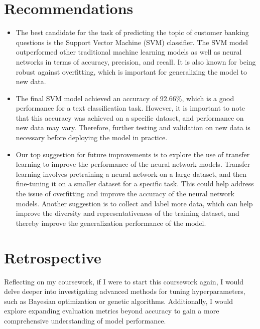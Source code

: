 \documentclass[12pt, a4paper]{article}
\begin{document}
\section{Recommendations}
\begin{itemize}
    \item The best candidate for the task of predicting the topic of customer banking questions is the Support Vector Machine (SVM) classifier. The SVM model outperformed other traditional machine learning models as well as neural networks in terms of accuracy, precision, and recall. It is also known for being robust against overfitting, which is important for generalizing the model to new data. 
    \item The final SVM model achieved an accuracy of 92.66\%, which is a good performance for a text classification task. However, it is important to note that this accuracy was achieved on a specific dataset, and performance on new data may vary. Therefore, further testing and validation on new data is necessary before deploying the model in practice.
    \item Our top suggestion for future improvements is to explore the use of transfer learning to improve the performance of the neural network models. Transfer learning involves pretraining a neural network on a large dataset, and then fine-tuning it on a smaller dataset for a specific task. This could help address the issue of overfitting and improve the accuracy of the neural network models. Another suggestion is to collect and label more data, which can help improve the diversity and representativeness of the training dataset, and thereby improve the generalization performance of the model.
\end{itemize}

\section{Retrospective}
Reflecting on my coursework, if I were to start this coursework again, I would delve deeper into investigating advanced methods for tuning hyperparameters, such as Bayesian optimization or genetic algorithms. Additionally, I would explore expanding evaluation metrics beyond accuracy to gain a more comprehensive understanding of model performance.


\newpage



\nocite{*}


% 


\end{document}

